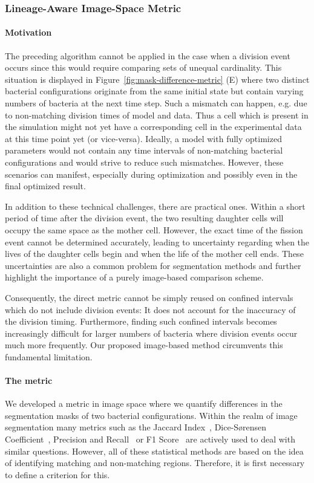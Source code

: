 \subsubsection{Lineage-Aware Image-Space Metric}
\label{subsec:image-space-metric}
\paragraph{Motivation}
The preceding algorithm cannot be applied in the case when a division event occurs since this would
require comparing sets of unequal cardinality.
This situation is displayed in Figure~\ref{fig:mask-difference-metric} (E) where two distinct
bacterial configurations originate from the same initial state but contain varying numbers of
bacteria at the next time step.
Such a mismatch can happen, e.g. due to non-matching division times of model and data.
Thus a cell which is present in the simulation might not yet have a corresponding cell in the
experimental data at this time point yet (or vice-versa).
Ideally, a model with fully optimized parameters would not contain any time intervals of
non-matching bacterial configurations and would strive to reduce such mismatches.
However, these scenarios can manifest, especially during optimization and possibly even in the final
optimized result.

In addition to these technical challenges, there are practical ones.
Within a short period of time after the division event, the two resulting daughter cells will occupy
the same space as the mother cell.
However, the exact time of the fission event cannot be determined accurately, leading to uncertainty
regarding when the lives of the daughter cells begin and when the life of the mother cell ends.
These uncertainties are also a common problem for segmentation methods and further highlight the
importance of a purely image-based comparison scheme.

Consequently, the direct metric cannot be simply reused on confined intervals which
do not include division events: It does not account for the inaccuracy of the division timing.
Furthermore, finding such confined intervals becomes increasingly difficult for larger numbers of
bacteria where division events occur much more frequently.
Our proposed image-based method circumvents this fundamental limitation.

\paragraph{The metric}
We developed a metric in image space where we quantify
differences in the segmentation masks of two bacterial configurations.
Within the realm of image segmentation many metrics such as the Jaccard Index~\cite{Murphy1996},
Dice-Sørensen Coefficient~\cite{Dice1945}, Precision and Recall~\cite{Takaya2015} or F1
Score~\cite{Taha2015} are actively used to deal with similar questions.
However, all of these statistical methods are based on the idea of identifying matching and
non-matching regions. Therefore, it is first necessary to define a criterion for this.

